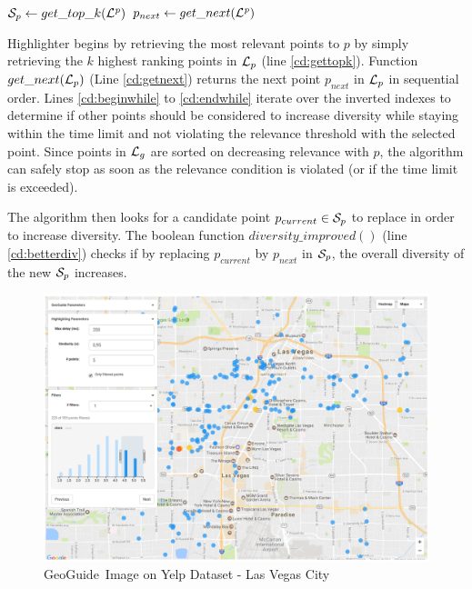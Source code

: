 \documentclass[conference,compsoc]{IEEEtran}
\newcommand{\framework}{{\sc GeoGuide}}
\begin{document}
\begin{algorithm}[t]
	\DontPrintSemicolon
	${\cal S}_p \gets get\_top\_k(\mathit{{\cal L}^p})$\;\label{cd:gettopk}
	$p_{next} \gets get\_next(\mathit{{\cal L}^p})$\;\label{cd:getnext}
	\label{cd:endwhile}
	\; 
	\caption{{\sc Highlighter} Algorithm}
	\label{algo:geoh}
\end{algorithm}

{\sc Highlighter} begins by retrieving the most relevant points to $p$ by simply retrieving the $k$ highest ranking points in ${\cal L}_p$ (line \ref{cd:gettopk}). Function $get\_next({\cal L}_p)$ (Line \ref{cd:getnext}) returns the next point $p_{next}$ in ${\cal L}_p$ in sequential order. Lines \ref{cd:beginwhile} to \ref{cd:endwhile} iterate over the inverted indexes to determine if other points should be considered to increase diversity while staying within the time limit and not violating the relevance threshold with the selected point. Since points in ${\cal L}_g$ are sorted on decreasing relevance with $p$, the algorithm can safely stop as soon as the relevance condition is violated (or if the time limit is exceeded).

The algorithm then looks for a candidate point $p_{current} \in {\cal S}_p$ to replace in order to increase diversity. The boolean function $\mathit{diversity\_improved}()$ (line \ref{cd:betterdiv}) checks if by replacing $p_{current}$ by $p_{next}$ in ${\cal S}_p$, the overall diversity of the new ${\cal S}_p$ increases.


\begin{figure}[t]
	\centering
	\includegraphics[width=5in, frame]{figs/yelp}
	\caption{\framework\ Image on Yelp Dataset - Las Vegas City}
	\label{fig:yelp}
	\vspace{-10pt}
\end{figure}
\end{document}
